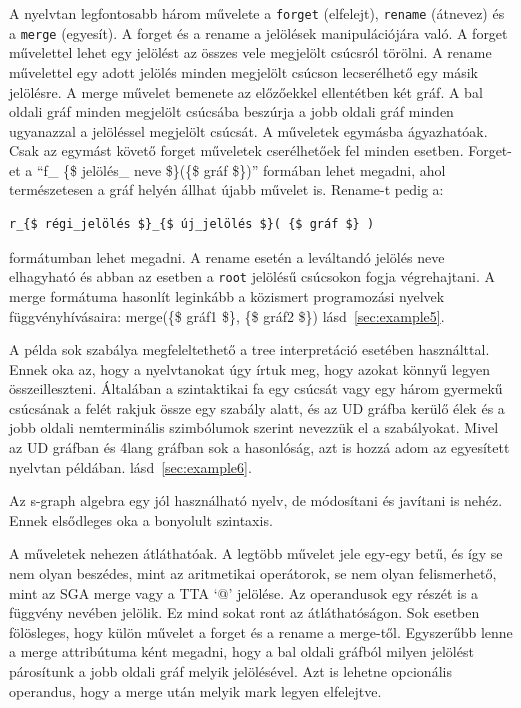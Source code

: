 A nyelvtan legfontosabb három művelete a \texttt{forget} (elfelejt), \texttt{rename} (átnevez) és a \texttt{merge} (egyesít). A forget és a rename a jelölések manipulációjára való. A forget művelettel lehet egy jelölést az összes vele megjelölt csúcsról törölni. A rename művelettel egy adott jelölés minden megjelölt csúcson lecserélhető egy másik jelölésre. A merge művelet bemenete az előzőekkel ellentétben két gráf. A bal oldali gráf minden megjelölt csúcsába beszúrja a jobb oldali gráf minden ugyanazzal a jelöléssel megjelölt csúcsát. A műveletek egymásba ágyazhatóak. Csak az egymást követő forget műveletek cserélhetőek fel minden esetben. Forget-et a “f\_ \{\$ jelölés\_ neve \$\}(\{\$ gráf \$\})”
 formában lehet megadni, ahol természetesen a gráf helyén állhat újabb művelet is.  Rename-t pedig a:
\begin{verbatim}
r_{$ régi_jelölés $}_{$ új_jelölés $}( {$ gráf $} )
\end{verbatim}
formátumban lehet megadni. A rename esetén a leváltandó jelölés neve elhagyható és abban az esetben a \texttt{root} jelölésű csúcsokon fogja végrehajtani. A merge formátuma hasonlít leginkább a közismert programozási nyelvek függvényhívásaira: merge(\{\$ gráf1 \$\}, \{\$ gráf2 \$\}) lásd~\ref{sec:example5}.

A példa sok szabálya megfeleltethető a tree interpretáció esetében használttal. Ennek oka az, hogy a nyelvtanokat úgy írtuk meg, hogy azokat könnyű legyen összeilleszteni. Általában a szintaktikai fa egy csúcsát vagy egy három gyermekű csúcsának a felét rakjuk össze egy szabály alatt, és az UD gráfba kerülő élek és a jobb oldali nemterminális szimbólumok szerint nevezzük el a szabályokat. Mivel az UD gráfban és 4lang gráfban sok a hasonlóság, azt is hozzá adom az egyesített nyelvtan példában. lásd~\ref{sec:example6}.

Az s-graph algebra egy jól használható nyelv, de módosítani és javítani is nehéz. Ennek elsődleges oka a bonyolult szintaxis.

A műveletek nehezen átláthatóak. A legtöbb művelet jele egy-egy betű, és így se nem olyan beszédes, mint az aritmetikai operátorok, se nem olyan felismerhető, mint az SGA merge vagy a TTA ‘@’ jelölése. Az operandusok egy részét is a függvény nevében jelölik.  Ez mind sokat ront az átláthatóságon. Sok esetben fölösleges, hogy külön művelet a forget és a rename a merge-től. Egyszerűbb lenne a merge attribútuma ként megadni, hogy a bal oldali gráfból milyen jelölést párosítunk a jobb oldali gráf melyik jelölésével. Azt is lehetne opcionális operandus, hogy a merge után melyik mark legyen elfelejtve.


